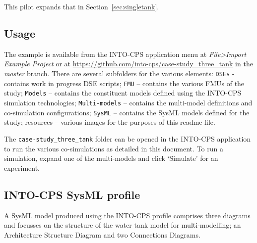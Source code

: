 This pilot expands that in Section~\ref{sec:singletank}.

\subsection{Usage}
\label{sec:threetank_usage}

The example is available from the INTO-CPS application menu at \emph{File>Import Example Project} or at  \url{https://github.com/into-cps/case-study\_three\_tank} in the \emph{master} branch. There are several subfolders for the various elements: \texttt{DSEs} - contains work in progress DSE scripts; \texttt{FMU} -- contains the various FMUs of the study; \texttt{Models} -- contains the constituent models defined using the INTO-CPS simulation technologies; \texttt{Multi-models} -- contains the multi-model definitions and co-simulation configurations; \texttt{SysML} -- contains the SysML models defined for the study; resources -- various images for the purposes of this readme file. 

The \texttt{case-study\_three\_tank} folder can be opened in the INTO-CPS application to run the various co-simulations as detailed in this document. To run a simulation, expand one of the multi-models and click `Simulate' for an experiment. 


%

\subsection{INTO-CPS SysML profile}
\label{sec:threetank_into_sys}

A SysML model produced using the INTO-CPS profile comprises three diagrams and focusses on the structure of the water tank model for multi-modelling; an Architecture Structure Diagram and two Connections Diagrams. 

